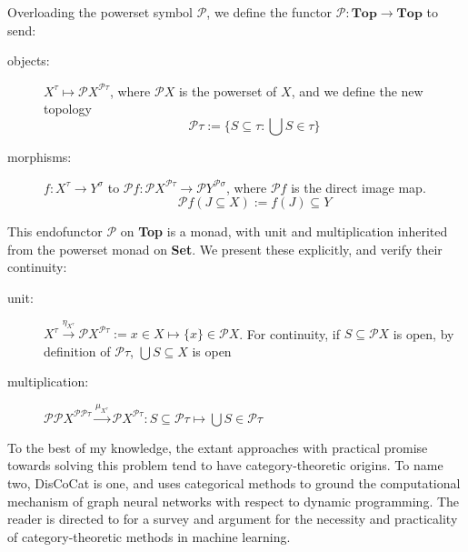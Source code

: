 

\begin{defn}
Overloading the powerset symbol $\mathcal{P}$, we define the functor $\mathcal{P}: \mathbf{Top} \rightarrow \mathbf{Top}$ to send:
\begin{description}
\item[objects:] $X^\tau \mapsto \mathcal{P}X^{\mathcal{P}\tau}$, where $\mathcal{P}X$ is the powerset of $X$, and we define the new topology \[\mathcal{P}\tau := \{ S \subseteq \tau : \bigcup S \in \tau \}\]
\item[morphisms:] $f: X^\tau \rightarrow Y^\sigma$ to $\mathcal{P}f: \mathcal{P}X^{\mathcal{P}\tau} \rightarrow \mathcal{P}Y^{\mathcal{P}\sigma}$, where $\mathcal{P}f$ is the direct image map.
\[\mathcal{P}f(J \subseteq X) := f(J) \subseteq Y\]
\end{description}
This endofunctor $\mathcal{P}$ on \textbf{Top} is a monad, with unit and multiplication inherited from the powerset monad on \textbf{Set}. We present these explicitly, and verify their continuity:
\begin{description}
\item[unit:] $X^\tau \overset{\eta_{X^{\tau}}}{\longrightarrow} \mathcal{P}X^{\mathcal{P}\tau} := x \in X \mapsto \{x\} \in \mathcal{P}X$.
For continuity, if $S \subseteq \mathcal{P}X$ is open, by definition of $\mathcal{P}\tau$, $\bigcup S \subseteq X$ is open
\item[multiplication:] $\mathcal{P}\mathcal{P}X^{\mathcal{P}\mathcal{P}\tau} \overset{\mu_{X^{\tau}}}{\longrightarrow} \mathcal{P}X^{\mathcal{P}\tau}: S \subseteq \mathcal{P}\tau \mapsto \bigcup S \in \mathcal{P}\tau$
\end{description}
\end{defn}



To the best of my knowledge, the extant approaches with practical promise towards solving this problem tend to have category-theoretic origins. To name two, DisCoCat \citep{} is one, and \citep{} uses categorical methods to ground the computational mechanism of graph neural networks with respect to dynamic programming. The reader is directed to \citep{} for a survey and argument for the necessity and practicality of category-theoretic methods in machine learning.\\




